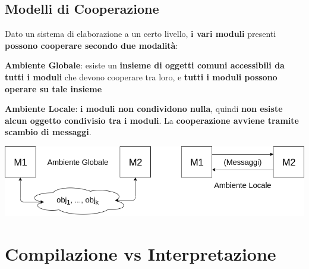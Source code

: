 \documentclass[10pt]{report}
\begin{document}
\subsection{Modelli di Cooperazione}
Dato un sistema di elaborazione a un certo livello, \textbf{i vari moduli} presenti \textbf{possono cooperare secondo due modalità}:
\begin{list}{}{}
	\item \textbf{Ambiente Globale}: esiste un \textbf{insieme di oggetti comuni accessibili da tutti i moduli} che devono cooperare tra loro, e \textbf{tutti i moduli possono operare su tale insieme}
	\item \textbf{Ambiente Locale}: \textbf{i moduli non condividono nulla}, quindi \textbf{non esiste alcun oggetto condivisio tra i moduli}. La \textbf{cooperazione avviene tramite scambio di messaggi}.
\end{list}
\begin{center}
\includegraphics[scale=0.5]{modellicoop.png}
\end{center}
\pagebreak
\section{Compilazione vs Interpretazione}
\end{document}
